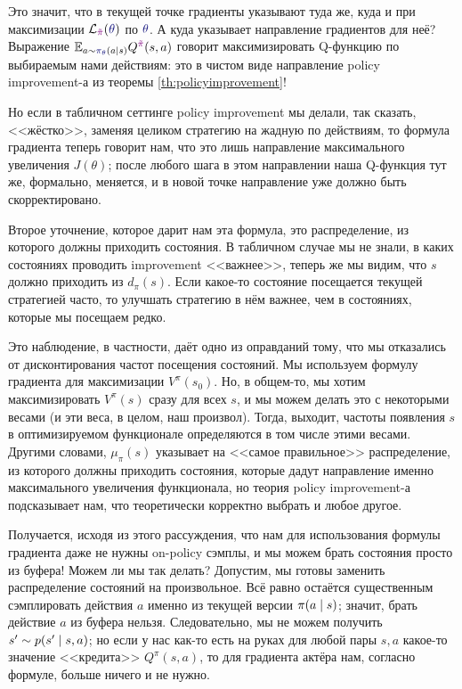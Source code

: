 Это значит, что в текущей точке градиенты указывают туда же, куда и при максимизации $\mathcal{L}_{\textcolor{ChadPurple}{\tilde{\pi}}}(\textcolor{ChadBlue}{\theta})$ по $\textcolor{ChadBlue}{\theta}$. А куда указывает направление градиентов для неё? Выражение $\E_{a \sim \textcolor{ChadBlue}{\pi_{\theta}}(a \mid s)} Q^{\textcolor{ChadPurple}{\tilde{\pi}}}(s, a)$ говорит максимизировать Q-функцию по выбираемым нами действиям: это в чистом виде направление policy improvement-а из теоремы \ref{th:policyimprovement}! 

Но если в табличном сеттинге policy improvement мы делали, так сказать, <<жёстко>>, заменяя целиком стратегию на жадную по действиям, то формула градиента теперь говорит нам, что это лишь направление максимального увеличения $J(\theta)$; после любого шага в этом направлении наша Q-функция тут же, формально, меняется, и в новой точке направление уже должно быть скорректировано. 

Второе уточнение, которое дарит нам эта формула, это распределение, из которого должны приходить состояния. В табличном случае мы не знали, в каких состояниях проводить improvement <<важнее>>, теперь же мы видим, что $s$ должно приходить из $d_{\pi}(s)$. Если какое-то состояние посещается текущей стратегией часто, то улучшать стратегию в нём важнее, чем в состояниях, которые мы посещаем редко.

Это наблюдение, в частности, даёт одно из оправданий тому, что мы отказались от дисконтирования частот посещения состояний. Мы используем формулу градиента для максимизации $V^\pi(s_0)$. Но, в общем-то, мы хотим максимизировать $V^\pi(s)$ сразу для всех $s$, и мы можем делать это с некоторыми весами (и эти веса, в целом, наш произвол). Тогда, выходит, частоты появления $s$ в оптимизируемом функционале определяются в том числе этими весами. Другими словами, $\mu_{\pi}(s)$ указывает на <<самое правильное>> распределение, из которого должны приходить состояния, которые дадут направление именно максимального увеличения функционала, но теория policy improvement-а подсказывает нам, что теоретически корректно выбрать и любое другое.

Получается, исходя из этого рассуждения, что нам для использования формулы градиента даже не нужны on-policy сэмплы, и мы можем брать состояния просто из буфера! Можем ли мы так делать? Допустим, мы готовы заменить распределение состояний на произвольное. Всё равно остаётся существенным сэмплировать действия $a$ именно из текущей версии $\pi(a \HM\mid s)$; значит, брать действие $a$ из буфера нельзя. Следовательно, мы не можем получить $s' \HM\sim p(s' \HM\mid s, a)$; но если у нас как-то есть на руках для любой пары $s, a$ какое-то значение <<кредита>> $Q^\pi(s, a)$, то для градиента актёра нам, согласно формуле, больше ничего и не нужно.

